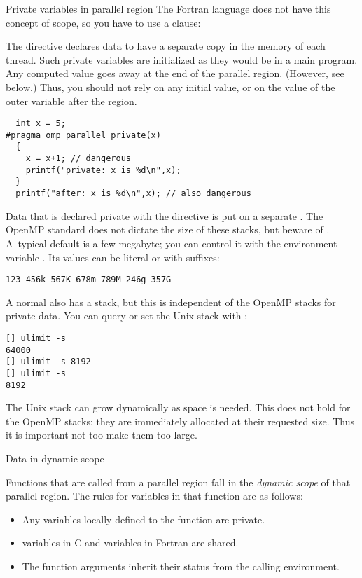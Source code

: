 \begin{fortrannote}{Private variables in parallel region}
  The Fortran language does not have this concept of scope, so you have to use a
   clause:
\end{fortrannote}

The  directive declares data to have a separate copy 
in the memory of each thread. 
Such private variables are initialized as they would be in a main program.
Any computed value goes away at the end 
of the parallel region. (However, see below.)
Thus, you should not rely on any initial value, or on the value of the outer variable
after the region.

\begin{lstlisting}
  int x = 5;
#pragma omp parallel private(x)
  {
    x = x+1; // dangerous
    printf("private: x is %d\n",x);
  }
  printf("after: x is %d\n",x); // also dangerous
\end{lstlisting}

Data that is declared private with the  directive is
put on a separate . The OpenMP standard
does not dictate the size of these stacks, but beware of .
A~typical default
is a few megabyte; you can control it with the environment variable
. Its values can be literal or with suffixes:
\begin{verbatim}
123 456k 567K 678m 789M 246g 357G
\end{verbatim}

A normal  also has a stack, but this is
independent of the OpenMP stacks for private data. You can query or
set the Unix stack with :
\begin{verbatim}
[] ulimit -s
64000
[] ulimit -s 8192
[] ulimit -s
8192
\end{verbatim}
The Unix stack can grow dynamically as space is needed. This does not
hold for the OpenMP stacks: they are immediately allocated at their
requested size. Thus it is important not too make them too large.

 {Data in dynamic scope}

Functions that are called from a parallel region fall in the
\emph{dynamic scope} of that
parallel region. The rules for variables in that function are as follows:
\begin{itemize}
\item Any variables locally defined to the function are private.
\item {} variables in C and  variables in Fortran
  are shared.
\item The function arguments inherit their status from the calling environment.
\end{itemize}

